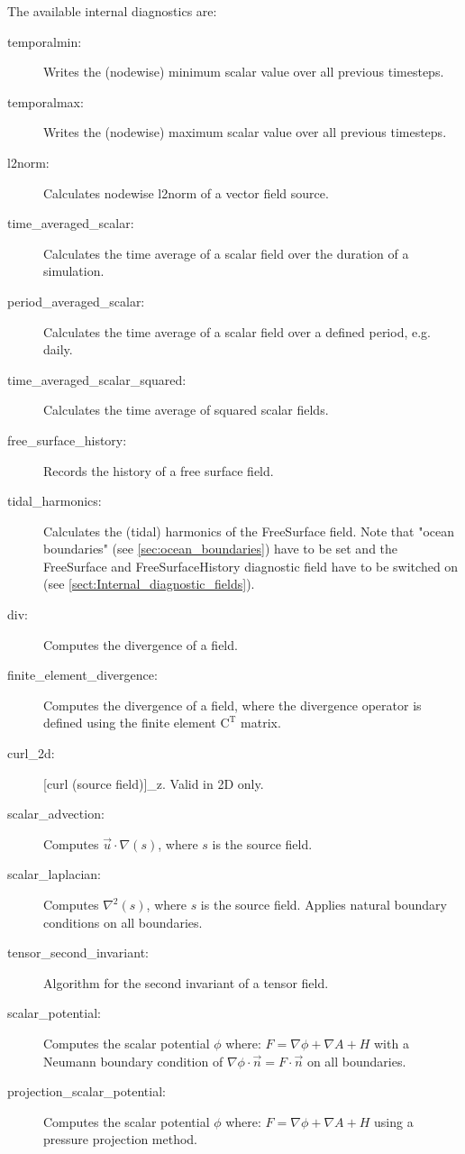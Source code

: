 The available internal  diagnostics are:
\begin{description}
\item[temporalmin:]Writes the (nodewise) minimum scalar value over all previous timesteps.
\item[temporalmax:]Writes the (nodewise) maximum scalar value over all previous timesteps.
\item[l2norm:]Calculates nodewise l2norm of a vector field source.
\item[time\_averaged\_scalar:]Calculates the time average of a scalar field over the duration of a simulation.
\item[period\_averaged\_scalar:]Calculates the time average of a scalar field over a defined period, e.g. daily.
\item[time\_averaged\_scalar\_squared:]Calculates the time average of squared scalar fields.
\item[free\_surface\_history:]Records the history of a free surface field.
\item[tidal\_harmonics:]Calculates the (tidal) harmonics of the FreeSurface field. Note that "ocean boundaries" (see \ref{sec:ocean_boundaries}) have to be set and the FreeSurface and FreeSurfaceHistory diagnostic field have to be switched on (see \ref{sect:Internal_diagnostic_fields}).  
\item[div:]Computes the divergence of a field.
\item[finite\_element\_divergence:]Computes the divergence of a field, where the divergence operator is defined using the finite element $\mathrm{C}^\mathrm{T}$ matrix.
\item[curl\_2d:][curl (source field)]\_z. Valid in 2D only.
\item[scalar\_advection:]Computes $\vec{u}\cdot\nabla(s)$, where $s$ is the source field.
\item[scalar\_laplacian:]Computes $\nabla^2(s)$, where $s$ is the source field. Applies natural boundary conditions on all boundaries.
\item[tensor\_second\_invariant:]Algorithm for the second invariant of a tensor field.
\item[scalar\_potential:]Computes the scalar potential $\phi$ where: $F = \nabla\phi + \nabla A + H$ with a Neumann boundary condition of $\nabla\phi \cdot \vec{n} = F \cdot \vec{n}$ on all boundaries.
\item[projection\_scalar\_potential:]Computes the scalar potential $\phi$ where: $F = \nabla\phi + \nabla A + H$ using a pressure projection method.

\end{description}
